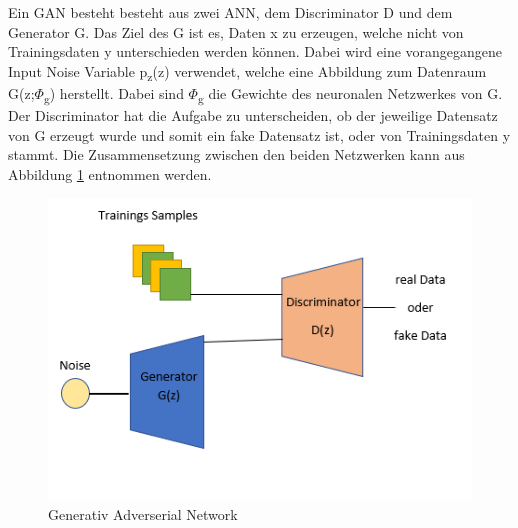 \documentclass{llncs}
\begin{document}
Ein GAN besteht besteht aus zwei ANN, dem Discriminator D und dem Generator G. Das Ziel des G ist es, Daten x zu erzeugen, welche nicht von Trainingsdaten y unterschieden werden können. Dabei wird eine vorangegangene Input Noise Variable p\textsubscript{z}(z) verwendet, welche eine Abbildung zum Datenraum G(z;$\Phi$\textsubscript{g}) herstellt. Dabei sind $\Phi$\textsubscript{g} die Gewichte des neuronalen Netzwerkes von G. Der Discriminator hat die Aufgabe zu unterscheiden, ob der jeweilige Datensatz von G erzeugt wurde und somit ein fake Datensatz ist, oder von Trainingsdaten y stammt\cite{goodfellow2014}. Die Zusammensetzung zwischen den beiden Netzwerken kann aus Abbildung \ref{fig:Bild5} entnommen werden.
\\
\begin{figure}[htbp] 
	\centering
	\includegraphics[width=1.0\textwidth]{GAN_GRUNDAUFBAU.png}
	\caption{Generativ Adverserial Network}
	\label{fig:Bild5}
\end{figure}
\end{document}
